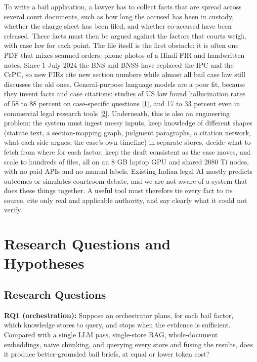 \documentclass[10pt,a4paper]{article}
\begin{document}
To write a bail application, a lawyer has to collect facts that are spread across several court documents, such as how long the accused has been in custody, whether the charge sheet has been filed, and whether co-accused have been released. These facts must then be argued against the factors that courts weigh, with case law for each point. The file itself is the first obstacle: it is often one PDF that mixes scanned orders, phone photos of a Hindi FIR and handwritten notes. Since 1 July 2024 the BNS and BNSS have replaced the IPC and the CrPC, so new FIRs cite new section numbers while almost all bail case law still discusses the old ones. General-purpose language models are a poor fit, because they invent facts and case citations: studies of US law found hallucination rates of 58 to 88 percent on case-specific questions [\href{https://arxiv.org/abs/2401.01301}{1}], and 17 to 33 percent even in commercial legal research tools [\href{https://arxiv.org/abs/2405.20362}{2}]. Underneath, this is also an engineering problem: the system must ingest messy inputs, keep knowledge of different shapes (statute text, a section-mapping graph, judgment paragraphs, a citation network, what each side argues, the case's own timeline) in separate stores, decide what to fetch from where for each factor, keep the draft consistent as the case moves, and scale to hundreds of files, all on an 8 GB laptop GPU and shared 2080 Ti nodes, with no paid APIs and no manual labels. Existing Indian legal AI mostly predicts outcomes or simulates courtroom debate, and we are not aware of a system that does these things together. A useful tool must therefore tie every fact to its source, cite only real and applicable authority, and say clearly what it could not verify.

\section{Research Questions and Hypotheses}

\subsection{Research Questions}

\textbf{RQ1 (orchestration):} Suppose an orchestrator plans, for each bail factor, which knowledge stores to query, and stops when the evidence is sufficient. Compared with a single LLM pass, single-store RAG, whole-document embeddings, naive chunking, and querying every store and fusing the results, does it produce better-grounded bail briefs, at equal or lower token cost?
\end{document}
